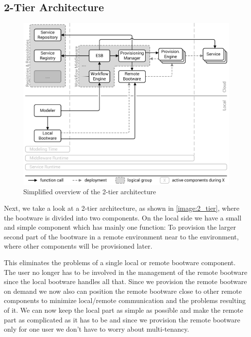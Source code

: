 \subsection{2-Tier Architecture}
\label{design:division:2tier}

\begin{figure}[!htbp]
	\centering
	\includegraphics[resolution=600]{design/assets/2_tier}
	\caption{Simplified overview of the 2-tier architecture}
	\label{image:2_tier}
\end{figure}

Next, we take a look at a 2-tier architecture, as shown in \autoref{image:2_tier}, where the bootware is divided into two components.
On the local side we have a small and simple component which has mainly one function: To provision the larger second part of the bootware in a remote environment near to the environment, where other components will be provisioned later.

This eliminates the problems of a single local or remote bootware component.
The user no longer has to be involved in the management of the remote bootware since the local bootware handles all that.
Since we provision the remote bootware on demand we now also can position the remote bootware close to other remote components to minimize local/remote communication and the problems resulting of it.
We can now keep the local part as simple as possible and make the remote part as complicated as it has to be and since we provision the remote bootware only for one user we don't have to worry about multi-tenancy.

